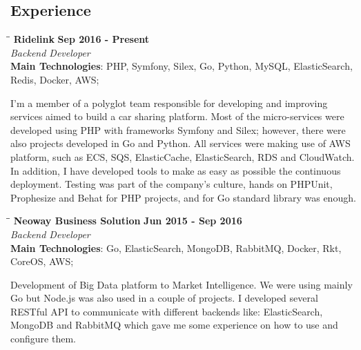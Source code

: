 \documentclass[margin]{res}
\begin{document}
\begin{resume}
\section{Experience}
\vspace{-0.1in}
    \begin{tabbing}
    \hspace{2.3in}\= \hspace{1.7in}\= \kill %
    \textbf{Ridelink}    \>\>\textbf{Sep 2016 - Present}\\
    \textit{Backend Developer}\\
    \textbf{Main Technologies}: PHP, Symfony, Silex, Go, Python, MySQL, ElasticSearch, \\Redis, Docker, AWS;
    \end{tabbing}\vspace{-20pt}      %
    \vspace{2mm}
I'm a member of a polyglot team responsible for developing and improving services aimed to build a car sharing platform. Most of the micro-services were developed using PHP with frameworks Symfony and Silex; however, there were also projects developed in Go and Python. All services were making use of AWS platform, such as ECS, SQS, ElasticCache, ElasticSearch, RDS and CloudWatch. In addition, I have developed tools to make as easy as possible the continuous deployment. Testing was part of the company’s culture, hands on PHPUnit, Prophesize and Behat for PHP projects, and for Go standard library was enough.

\vspace{-0.1in}
    \begin{tabbing}
    \hspace{2.3in}\= \hspace{1.7in}\= \kill %
    \textbf{Neoway Business Solution}    \>\>\textbf{Jun 2015 - Sep 2016}\\
    \textit{Backend Developer}\\
    \textbf{Main Technologies}: Go, ElasticSearch, MongoDB, RabbitMQ, Docker, Rkt,\\CoreOS, AWS;
    \end{tabbing}\vspace{-20pt}      %
    \vspace{2mm}
Development of Big Data platform to Market Intelligence. We were using mainly Go but Node.js was also used in a couple of projects. I developed several RESTful API to communicate with different backends like: ElasticSearch, MongoDB and RabbitMQ which gave me some experience on how to use and configure them.


\end{resume}
\end{document}
